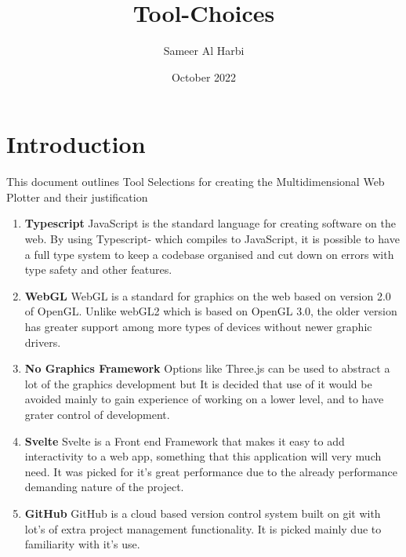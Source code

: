 \documentclass{article}
\title{Tool-Choices}
\author{Sameer Al Harbi}
\date{October 2022}
\begin{document}
\maketitle

\section{Introduction}
This document outlines Tool Selections for creating the Multidimensional Web Plotter and their justification

\begin{enumerate}
    \item \textbf{Typescript} JavaScript is the standard language for creating software on the web. By using Typescript- which compiles to JavaScript, it is possible to have a full type system to keep a codebase organised and cut down on errors with type safety and other features.
    \item \textbf{WebGL} WebGL is a standard for graphics on the web based on version 2.0 of OpenGL. Unlike webGL2 which is based on OpenGL 3.0, the older version has greater support among more types of devices without newer graphic drivers.
    \item \textbf{No Graphics Framework} Options like Three.js can be used to abstract a lot of the graphics development but It is decided that use of it would be avoided mainly to gain experience of working on a lower level, and to have grater control of development. 
    \item \textbf{Svelte} Svelte is a Front end Framework that makes it easy to add interactivity to a web app, something that this application will very much need. It was picked for it's great performance due to the already performance demanding nature of the project. 
    \item \textbf{GitHub} GitHub is a cloud based version control system built on git with lot's of extra project management functionality. It is picked mainly due to familiarity with it's use.
\end{enumerate}
\end{document}
